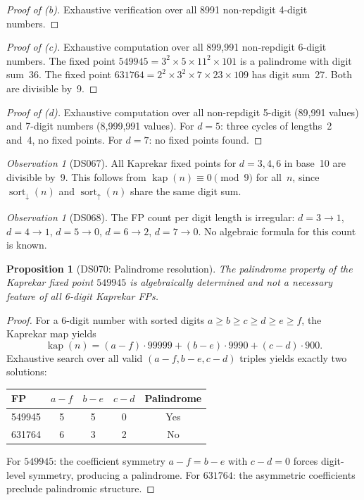 \documentclass[11pt,a4paper]{amsart}
\theoremstyle{plain}
\newtheorem{proposition}[theorem]{Proposition}
\theoremstyle{definition}
\theoremstyle{remark}
\newtheorem{observation}[theorem]{Observation}
\DeclareMathOperator{\sort}{sort}
\DeclareMathOperator{\kap}{kap}
\begin{document}
\begin{proof}[Proof of \textup{(b)}]
Exhaustive verification over all 8991 non-repdigit 4-digit numbers.
\end{proof}

\begin{proof}[Proof of \textup{(c)}]
Exhaustive computation over all 899{,}991 non-repdigit 6-digit numbers.
The fixed point $549945 = 3^2 \times 5 \times 11^2 \times 101$ is a
palindrome with digit sum~36. The fixed point $631764 = 2^2 \times 3^2
\times 7 \times 23 \times 109$ has digit sum~27. Both are divisible by~9.
\end{proof}

\begin{proof}[Proof of \textup{(d)}]
Exhaustive computation over all non-repdigit 5-digit (89{,}991 values) and
7-digit numbers (8{,}999{,}991 values). For $d = 5$: three cycles of
lengths~2 and~4, no fixed points. For $d = 7$: no fixed points found.
\end{proof}

\begin{observation}[DS067]
All Kaprekar fixed points for $d = 3, 4, 6$ in base~10 are divisible by~9.
This follows from $\kap(n) \equiv 0 \pmod{9}$ for all~$n$, since
$\sort_\downarrow(n)$ and $\sort_\uparrow(n)$ share the same digit sum.
\end{observation}

\begin{observation}[DS068]\label{obs:kap-irregular}
The FP count per digit length is irregular: $d = 3 \to 1$, $d = 4 \to 1$,
$d = 5 \to 0$, $d = 6 \to 2$, $d = 7 \to 0$.
No algebraic formula for this count is known.
\end{observation}

\begin{proposition}[DS070: Palindrome resolution]\label{prop:palindrome-kap}
The palindrome property of the Kaprekar fixed point $549945$ is algebraically
determined and \emph{not} a necessary feature of all 6-digit Kaprekar FPs.
\end{proposition}

\begin{proof}
For a 6-digit number with sorted digits $a \geq b \geq c \geq d \geq e \geq f$,
the Kaprekar map yields
\[
\kap(n) = (a{-}f) \cdot 99999 + (b{-}e) \cdot 9990 + (c{-}d) \cdot 900.
\]
Exhaustive search over all valid $(a{-}f, b{-}e, c{-}d)$ triples yields
exactly two solutions:
\begin{center}
\begin{tabular}{@{}lcccc@{}}
\toprule
FP & $a{-}f$ & $b{-}e$ & $c{-}d$ & Palindrome \\
\midrule
549945 & 5 & 5 & 0 & Yes \\
631764 & 6 & 3 & 2 & No \\
\bottomrule
\end{tabular}
\end{center}
For $549945$: the coefficient symmetry $a{-}f = b{-}e$ with $c{-}d = 0$
forces digit-level symmetry, producing a palindrome. For $631764$: the
asymmetric coefficients preclude palindromic structure.
\end{proof}
\end{document}
